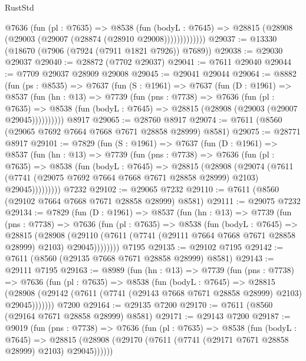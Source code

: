 \begin{lexlean}{RustStd}
\begin{coremodule}
              @7636
                (fun (pl : @7635) =>
                @8538
                  (fun (bodyL : @7645) =>
                  @28815 (@28908 (@29003 (@29007 (@28874 (@28910 @29008)))))))))))))
@29037 := @13330 (@18670 (@7906 (@7924 (@7911 @1821 @7926)) @7689))
@29038 := @29030 @29037
@29040 := @28872 (@7702 @29037)
@29041 := @7611 @29040
@29044 := @7709 @29037 @28909 @29008
@29045 := @29041 @29044
@29064 := @8882
    (fun (ps : @8535) =>
    @7637
      (fun (S : @1961) =>
      @7637
        (fun (D : @1961) =>
        @8537
          (fun (hn : @13) =>
          @7739
            (fun (pns : @7738) =>
            @7636
              (fun (pl : @7635) =>
              @8538 (fun (bodyL : @7645) => @28815 (@28908 (@29003 (@29007 @29045))))))))))
    @8917
@29065 := @28760 @8917
@29074 := @7611 (@8560 (@29065 @7692 @7664 @7668 @7671 @28858 @28999) @8581)
@29075 := @28771 @8917
@29101 := @7829
    (fun (S : @1961) =>
    @7637
      (fun (D : @1961) =>
      @8537
        (fun (hn : @13) =>
        @7739
          (fun (pns : @7738) =>
          @7636
            (fun (pl : @7635) =>
            @8538
              (fun (bodyL : @7645) =>
              @28815
                (@28908
                  (@29074
                    (@7611
                      (@7741 (@29075 @7692 @7664 @7668 @7671 @28858 @28999) @2103)
                      @29045)))))))))
    @7232
@29102 := @29065 @7232
@29110 := @7611 (@8560 (@29102 @7664 @7668 @7671 @28858 @28999) @8581)
@29111 := @29075 @7232
@29134 := @7829
    (fun (D : @1961) =>
    @8537
      (fun (hn : @13) =>
      @7739
        (fun (pns : @7738) =>
        @7636
          (fun (pl : @7635) =>
          @8538
            (fun (bodyL : @7645) =>
            @28815
              (@28908
                (@29110 (@7611 (@7741 (@29111 @7664 @7668 @7671 @28858 @28999) @2103) @29045))))))))
    @7195
@29135 := @29102 @7195
@29142 := @7611 (@8560 (@29135 @7668 @7671 @28858 @28999) @8581)
@29143 := @29111 @7195
@29163 := @8989
    (fun (hn : @13) =>
    @7739
      (fun (pns : @7738) =>
      @7636
        (fun (pl : @7635) =>
        @8538
          (fun (bodyL : @7645) =>
          @28815
            (@28908 (@29142 (@7611 (@7741 (@29143 @7668 @7671 @28858 @28999) @2103) @29045)))))))
    @7200
@29164 := @29135 @7200
@29170 := @7611 (@8560 (@29164 @7671 @28858 @28999) @8581)
@29171 := @29143 @7200
@29187 := @9019
    (fun (pns : @7738) =>
    @7636
      (fun (pl : @7635) =>
      @8538
        (fun (bodyL : @7645) =>
        @28815 (@28908 (@29170 (@7611 (@7741 (@29171 @7671 @28858 @28999) @2103) @29045))))))

\end{coremodule}
\end{lexlean}
